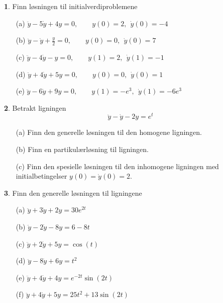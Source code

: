 \documentclass{article}
\theoremstyle{definition}
\newtheorem{oppg}{}
\theoremstyle{remark}
\begin{document}
\begin{multicols*}{2}
\begin{oppg}
  Finn løsningen til initialverdiproblemene
  \begin{itemize}
    \item[(a)] $\ddot{y} - 5\dot{y} + 4y = 0, \qquad y(0) = 2,\ \ \dot{y}(0) = -4$
    \item[(b)] $\ddot{y} - \dot{y} + \frac{y}{2} = 0, \qquad y(0) = 0,\ \ \dot{y}(0) = 7$
    \item[(c)] $\ddot{y} - 4\dot{y} - y = 0, \qquad y(1) = 2,\ \ \dot{y}(1) = -1$
    \item[(d)] $\ddot{y} + 4\dot{y} + 5y = 0, \qquad y(0) = 0,\ \ \dot{y}(0) = 1$
    \item[(e)] $\ddot{y} - 6\dot{y} + 9y = 0, \qquad y(1) = -e^3,\ \ \dot{y}(1) = -6e^3$
  \end{itemize}
\end{oppg}

\begin{oppg}  
  Betrakt ligningen
  \begin{equation*}
    \ddot{y} - \dot{y} - 2y = e^t
  \end{equation*}
  \begin{itemize}
    \item[(a)] Finn den generelle løsningen til den homogene ligningen.
    \item[(b)] Finn en partikulærløsning til ligningen.
    \item[(c)] Finn den spesielle løsningen til den inhomogene ligningen med initialbetingelser $y(0) = \dot{y}(0) = 2$.
  \end{itemize}
\end{oppg}

\begin{oppg}  
  Finn den generelle løsningen til ligningene
  \begin{itemize}
    \item[(a)] $\ddot{y} + 3\dot{y} + 2y = 30e^{2t}$
    \item[(b)] $\ddot{y} - 2\dot{y} - 8y = 6 - 8t$
    \item[(c)] $\ddot{y} + 2\dot{y} + 5y = \cos(t)$
    \item[(d)] $\ddot{y} - 8\dot{y} + 6y = t^2$
    \item[(e)] $\ddot{y} + 4\dot{y} + 4y = e^{-2t} \sin(2t)$
    \item[(f)] $\ddot{y} + 4\dot{y} + 5y = 25t^2 + 13\sin(2t)$ 
  \end{itemize}
\end{oppg}


\end{multicols*}
\end{document}
